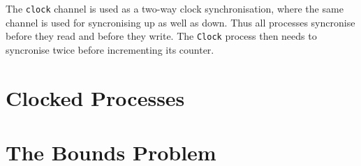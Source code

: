 The \texttt{clock} channel is used as a two-way clock synchronisation, where the same channel is used for syncronising up as well as down. Thus all processes syncronise before they read and before they write. The \texttt{Clock} process then needs to syncronise twice before incrementing its counter. \\














\section{Clocked Processes}

%
%



\section{The Bounds Problem}

